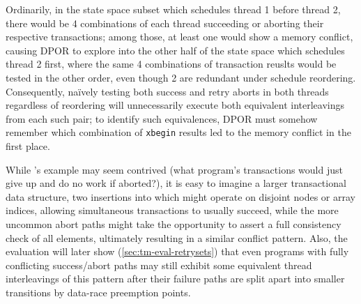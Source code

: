 Ordinarily, in the state space subset which schedules thread 1 before thread 2,
there would be 4 combinations of each thread succeeding or aborting their respective transactions;
among those, at least one would show a memory conflict,
causing DPOR to explore into the other half of the state space which schedules thread 2 first,
where the same 4 combinations of transaction reuslts would be tested in the other order,
even though 2 are redundant under schedule reordering.
Consequently, na\"ively testing both success and retry aborts in both threads regardless of reordering
will unnecessarily execute %
both equivalent interleavings from each such pair;
to identify such equivalences,
DPOR must somehow remember which combination of {\tt xbegin} results led to the memory conflict in the first place.

While 's example may seem contrived
(what program's transactions would just give up and do no work if aborted?),
it is easy to imagine a larger transactional data structure,
two insertions into which might operate on disjoint nodes or array indices,
allowing simultaneous transactions to usually succeed,
while the more uncommon abort paths might take the opportunity to assert a full consistency check of all elements,
ultimately resulting in a similar conflict pattern.
Also, the evaluation will later show
(\cref{sec:tm-eval-retrysets})
that even programs with fully conflicting success/abort paths
may still exhibit some equivalent thread interleavings of this pattern
after their failure paths are split apart into smaller transitions by data-race preemption points.


